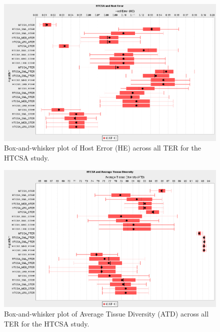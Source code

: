 \begin{figure}[htp]
	\centering
		\includegraphics[scale=0.70]{Tissues/HTCSA-HE}
	\caption{Box-and-whisker plot of Host Error (HE) across all TER for the HTCSA study.}
	\label{fig:tissues:htcsa:he:boxplot}
\end{figure}

\begin{figure}[htp]
	\centering
		\includegraphics[scale=0.70]{Tissues/HTCSA-ATD}
	\caption{Box-and-whisker plot of Average Tissue Diversity (ATD) across all TER for the HTCSA study.}
	\label{fig:tissues:htcsa:atd:boxplot}
\end{figure}

